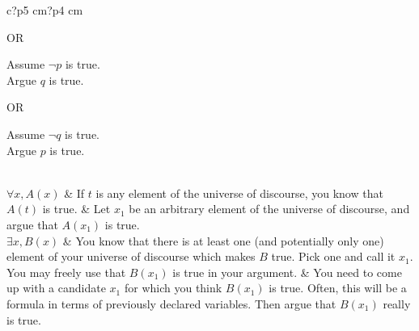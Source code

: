 \documentclass{article}
\begin{document}
\begin{table}[h]
\begin{tabular}{c?p{5 cm}?p{4 cm}}
		     \medskip
		 
		     OR
		
		 \begin{fitch*}
		 	\textrm{Assume $\neg p$ is true.}\\
		 	\fa \textrm{Argue $q$ is true. }
		 	\end{fitch*}
	 	
	 	OR 
	 	
	 			 \begin{fitch*}
	 		\textrm{Assume $\neg q$ is true.}\\
	 		\fa \textrm{Argue $p$ is true. }
	 	\end{fitch*}

		 \\ \hline
		$\forall x, A(x)$ & If $t$ is any element of the universe of discourse, you know that $A(t)$ is true. &  Let $x_1$ be an arbitrary element of the universe of discourse, and argue that $A(x_1)$ is true. \\ \hline
		$\exists x, B(x)$ & You know that there is at least one (and potentially only one) element of your universe of discourse which makes $B$ true.  Pick one and call it $x_1$.  You may freely use that $B(x_1)$ is true in your argument. &  You need to come up with a candidate $x_1$ for which you think $B(x_1)$ is true.  Often, this will be a formula in terms of previously declared variables.  Then argue that $B(x_1)$ really is true.
	\end{tabular}
\end{table}


	
\end{document}
